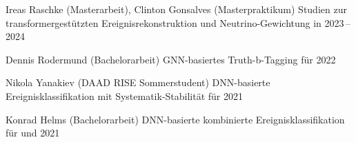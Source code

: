 \begin{cvhonors}[1mm]
  \cvhonor
    {Ireas Raschke \textmd{(Masterarbeit),} Clinton Gonsalves \textmd{(Masterpraktikum)}} %
    {%
      \newline
      Studien zur transformergest\"utzten Ereignisrekonstruktion und Neutrino-Gewichtung in \ttHWW%
    } %
    {} %
    {2023\,--\,2024} %


  \cvhonor
    {Dennis Rodermund \textmd{(Bachelorarbeit)}} %
    {%
      \newline
      GNN-basiertes Truth-b-Tagging f\"ur \ttHbb%
    } %
    {} %
    {2022} %

  \cvhonor
    {Nikola Yanakiev \textmd{(DAAD RISE Sommerstudent)}} %
    {%
      \newline
      DNN-basierte Ereignisklassifikation mit Systematik-Stabilit\"at f\"ur \ttHbb%
    } %
    {} %
    {2021} %

  \cvhonor
    {Konrad Helms \textmd{(Bachelorarbeit)}} %
    {%
      \newline
      DNN-basierte kombinierte Ereignisklassifikation f\"ur \ttHbb und \tHbb%
    } %
    {} %
    {2021} %
\end{cvhonors}
